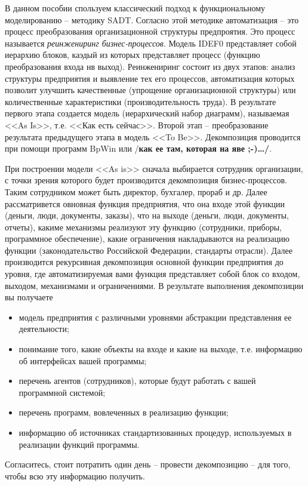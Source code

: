 \documentclass[a4paper,14pt,final]{extreport}
\newcommand{\aaa}[1]{{/\bfseries #1\ldots/}}
\begin{document}
В данном пособии спользуем классический подход к функциональному моделированию -- методику SADT.  Согласно этой методике автоматизация -- это процесс преобразования организационной структуры предпроятия.   Это процесс называется \emph{реинжениринг бизнес-процессов}.  Модель IDEF0 представляет собой иерархию блоков, каэдый из которых представляет процесс (функцию преобразования входа нв выход).  Реинжениринг состоит из двух этапов: анализ структуры предприятия и выявление тех его процессов, автоматизация которых позволит улучшить качественные (упрощение организационной структуры) или количественные характеристики (производительность труда).  В результате первого этапа создается модель (иерархический набор диаграмм), называемая <<As Is>>, т.е. <<Как есть сейчас>>.   Второй этап -- преобразование результата предыдущего этапа в модель <<To Be>>.  Декомпозиция проводится при помощи программ BpWin \cite{bpwin} или \aaa{как ее там, которая на яве ;-)\cite{rrrrr}}.

При построении модели <<As is>> сначала выбирается сотрудник организации, с точки зрения которого будет производится декомпозиция бизнес-процессов.  Таким сотрудником может быть директор, бухгалер, прораб и др.  Далее рассматривется овновная функция предприятия, что она входе этой функции (деньги, люди, документы, заказы), что на выходе (деньги, люди, документы, отчеты), какиме механизмы реализуют эту функцию (сотрудники, приборы, программное обеспечение), какие ограничения накладываются на реализацию функции (законодательство Российской Федерации, стандарты отрасли).  Далее производится рекурсивная декомпозиция основной функции предприятия до уровня, где автоматизируемая вами функция представляет собой блок со входом, выходом, механизмами и ограничениями.  В результате выполнения декомпозиции вы получаете
\begin{itemize}
\item модель предприятия с различными уровнями абстракции
  представления ее деятельности;
\item понимание того, какие объекты на входе и какие на выходе, т.е. информацию об интерфейсах вашей программы;
\item перечень агентов (сотрудников), которые будут работать с вашей программной системой;
\item перечень программ, вовлеченных в реализацию функции;
\item информацию об источниках стандартизованных процедур, используемых в реализации функций программы.
\end{itemize}
Согласитесь, стоит потратить один день -- провести декомпозицию -- для того, чтобы всю эту информацию получить.
\end{document}
